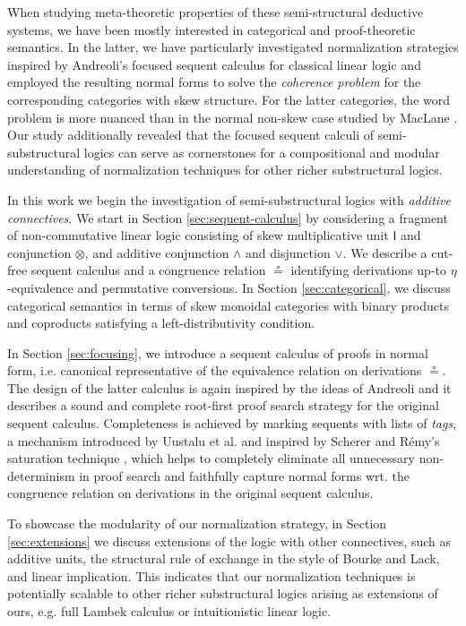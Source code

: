 \documentclass[submission,copyright,creativecommons]{eptcs}
\theoremstyle{definition}
\newcommand{\ot}{\otimes}
\newcommand{\I}{\mathsf{I}}
\begin{document}
When studying meta-theoretic properties of these semi-structural deductive systems, we have been mostly interested in categorical and proof-theoretic semantics. In the latter, we have particularly investigated normalization strategies inspired by Andreoli's focused sequent calculus for classical linear logic \cite{andreoli:logic:1992} and employed the resulting normal forms to solve the \emph{coherence problem} for the corresponding categories with skew structure. For the latter categories, the word problem is more nuanced than in the normal non-skew case studied by MacLane \cite{maclane1963natural}. Our study additionally revealed that the focused sequent calculi of semi-substructural logics can serve as cornerstones for a compositional and modular understanding of normalization techniques for other richer substructural logics.

In this work we begin the investigation of  semi-substructural logics with \emph{additive connectives}. We start in Section \ref{sec:sequent-calculus} by considering a fragment of non-commutative linear logic consisting of skew multiplicative unit $\I$ and conjunction $\ot$, and additive conjunction $\land$ and disjunction $\lor$. We describe a cut-free sequent calculus and a congruence relation $\circeq$ identifying derivations up-to $\eta$-equivalence and permutative conversions. In Section \ref{sec:categorical}, we discuss categorical semantics in terms of skew monoidal categories with binary products and coproducts satisfying a left-distributivity condition.

In Section \ref{sec:focusing}, we introduce a sequent calculus of proofs in normal form, i.e. canonical representative of the equivalence relation on derivations $\circeq$. The design of the latter calculus is again inspired by the ideas of Andreoli and it describes a sound and complete root-first proof search strategy for the original sequent calculus. Completeness is achieved by marking sequents with lists of \emph{tags}, a mechanism introduced by Uustalu et al. \cite{UVW:protsn} and inspired by Scherer and R{\'e}my's saturation technique \cite{scherer:simple:2015}, which helps to completely eliminate all unnecessary non-determinism in proof search and faithfully capture normal forms wrt. the congruence relation on derivations in the original sequent calculus. %

To showcase the modularity of our normalization strategy, in Section \ref{sec:extensions} we discuss extensions of the logic with other connectives, such as additive units, the structural rule of exchange in the style of Bourke and Lack, and linear implication.
This indicates that our normalization techniques is potentially scalable to  other richer substructural logics arising as extensions of ours, e.g. full Lambek calculus or intuitionistic linear logic.
\end{document}
